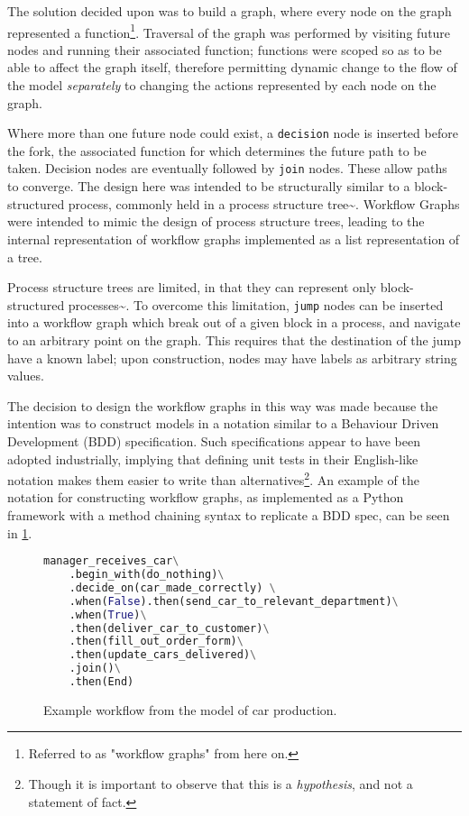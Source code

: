 \documentclass[11pt]{article}
\begin{document}
The solution decided upon was to build a graph, where every node on the graph
represented a function\footnote{Referred to as "workflow graphs" from here on.}.
Traversal of the graph was performed by visiting future nodes and running their
associated function; functions were scoped so as to be able to affect the graph
itself, therefore permitting dynamic change to the flow of the model
\emph{separately} to changing the actions represented by each node on the graph.

Where more than one future node could exist, a \texttt{decision} node is inserted
before the fork, the associated function for which determines the future path to
be taken. Decision nodes are eventually followed by \texttt{join} nodes. These allow
paths to converge. The design here was intended to be structurally similar to a
block-structured process, commonly held in a process structure
tree\textasciitilde{}\cite{thesis_process_structure_trees}. Workflow Graphs were intended to
mimic the design of process structure trees, leading to the internal
representation of workflow graphs implemented as a list representation of a
tree.

Process structure trees are limited, in that they can represent only
block-structured processes\textasciitilde{}\cite{thesis_process_structure_trees}. To overcome
this limitation, \texttt{jump} nodes can be inserted into a workflow graph which break
out of a given block in a process, and navigate to an arbitrary point on the
graph. This requires that the destination of the jump have a known label; upon
construction, nodes may have labels as arbitrary string values.

The decision to design the workflow graphs in this way was made because the
intention was to construct models in a notation similar to a Behaviour Driven
Development (BDD) specification. Such specifications appear to have been adopted
industrially, implying that defining unit tests in their English-like notation
makes them easier to write than alternatives\footnote{Though it is important to
observe that this is a \emph{hypothesis}, and not a statement of fact.}. An example
of the notation for constructing workflow graphs, as implemented as a Python
framework with a method chaining syntax to replicate a BDD
spec\cite{wfgraphs_repo}, can be seen in \cref{fig:wfgraphs_example_code}.


\begin{figure}
\begin{center}
\begin{lstlisting}[language=python]
manager_receives_car\
    .begin_with(do_nothing)\
    .decide_on(car_made_correctly) \
    .when(False).then(send_car_to_relevant_department)\
    .when(True)\
    .then(deliver_car_to_customer)\
    .then(fill_out_order_form)\
    .then(update_cars_delivered)\
    .join()\
    .then(End)
\end{lstlisting}
\end{center}
\caption{Example workflow from the model of car production.}
\label{fig:wfgraphs_example_code}
\end{figure}
\end{document}
